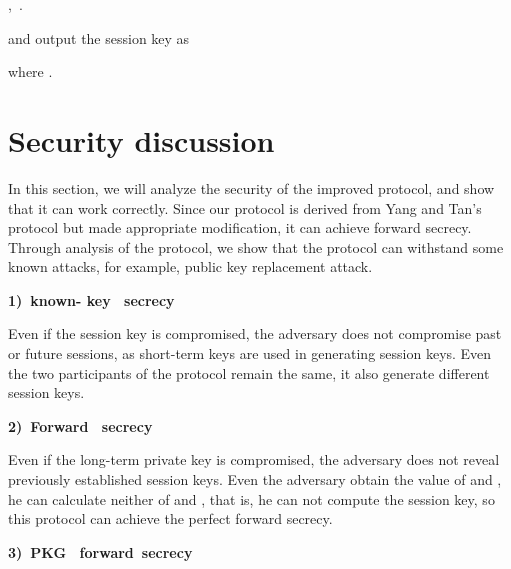 \documentclass[final,1p,times,twocolumn]{elsarticle}
\begin{document}
,\ .

and output the session key as

\vspace{0.1cm}



\vspace{0.1cm}

where .

































\section{Security discussion}

\label{5}


In this section, we will analyze the security of the improved protocol, and show that it can work correctly. Since our protocol is derived from Yang and Tan's protocol but made appropriate modification, it can achieve forward secrecy. Through analysis of the protocol, we show that the protocol can withstand some known attacks, for example, public key replacement attack.

 {\bf 1)\  known- key \ secrecy}

Even if the session key is compromised, the adversary does not compromise past or future sessions, as short-term keys are used in generating session keys. Even the two participants  of the protocol remain the same, it also generate different session keys.

{\bf 2)\  Forward \ secrecy}

Even if the long-term private key is compromised, the adversary does not reveal previously established session keys. Even the adversary obtain  the value of  and , he can calculate neither of  and , that is, he can not compute the session key, so this protocol can achieve the perfect forward secrecy.

{\bf 3)\  PKG \ forward\  secrecy}
\end{document}
